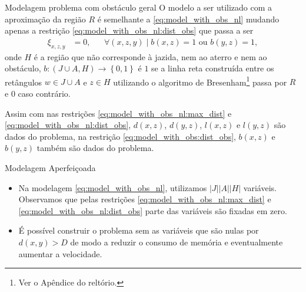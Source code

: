 \documentclass[11pt]{beamer}
\begin{document}
\begin{frame}{Modelagem problema com obstáculo geral}
O modelo a ser utilizado com a aproximação da região $R$ é semelhante a
\eqref{eq:model_with_obs_nl} mudando apenas a restrição
\eqref{eq:model_with_obs_nl:dist_obs} que passa a ser
\begin{align}
    \xi_{x, z, y} &= 0, && \forall (x, z, y) \mid b(x, z) = 1 \text{ ou }
    b(y, z) = 1,
    \label{eq:model_with_obs:dist_obs} 
\end{align}
onde $H$ é a região que não corresponde \`{a} jazida, nem ao aterro e nem ao
obstáculo, $b: (J \cup A, H) \to \left\{ 0, 1 \right\}$ é $1$ se a linha reta
construída entre os retângulos $w \in J \cup A$ e $z \in H$ utilizando o
algoritmo de Bresenham\footnote{Ver o Apêndice do reltório.}%
passa por $R$ e $0$ caso contrário.

Assim com nas restrições \eqref{eq:model_with_obs_nl:max_dist} e
\eqref{eq:model_with_obs_nl:dist_obs}, $d(x, z)$, $d(y, z)$, $l(x, z)$ e $l(y,
z)$ são dados do problema, na restri\c{c}\~{a}o
\eqref{eq:model_with_obs:dist_obs}, $b(x, z)$ e $b(y, z)$ tamb\'{e}m s\~{a}o
dados do problema.
\end{frame}

\begin{frame}{Modelagem Aperfeiçoada}
	\begin{itemize}
		\item Na modelagem \eqref{eq:model_with_obs_nl}, utilizamos $|J| |A| |H|$
vari\'{a}veis. Observamos que pelas restri\c{c}\~{o}es \eqref{eq:model_with_obs_nl:max_dist} e
\eqref{eq:model_with_obs_nl:dist_obs} parte das vari\'{a}veis s\~{a}o fixadas em
zero.
		\item \'{E} poss\'{i}vel construir o problema sem as vari\'{a}veis que s\~{a}o nulas por $d(x, y) > D$ de modo a reduzir o consumo de mem\'{o}ria e eventualmente aumentar a velocidade.
	\end{itemize}
\end{frame}
\end{document}
